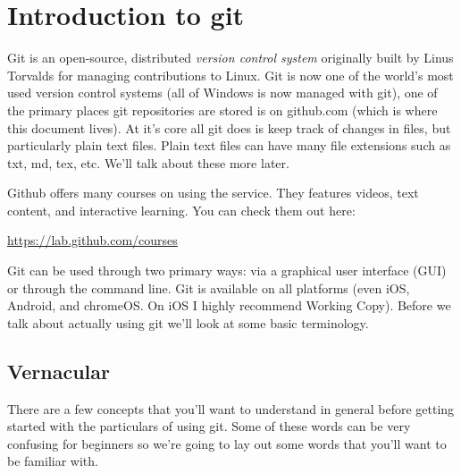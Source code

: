 \section{Introduction to git}



Git is an open-source, distributed \textit{version control system} originally built by Linus Torvalds for managing contributions to Linux. Git is now one of the world's most used version control systems (all of Windows is now managed with git), one of the primary places git repositories are stored is on github.com (which is where this document lives). At it's core all git does is keep track of changes in files, but particularly plain text files. Plain text files can have many file extensions such as txt, md, tex, etc. We'll talk about these more later.

Github offers many courses on using the service. They features videos, text content, and interactive learning. You can check them out here:

\begin{center}
	\url{https://lab.github.com/courses}
\end{center}

Git can be used through two primary ways: via a graphical user interface (GUI) or through the command line. Git is available on all platforms (even iOS, Android, and chromeOS. On iOS I highly recommend Working Copy). Before we talk about actually using git we'll look at some basic terminology.


\subsection{Vernacular}

There are a few concepts that you'll want to understand in general before getting started with the particulars of using git. Some of these words can be very confusing for beginners so we're going to lay out some words that you'll want to be familiar with.

